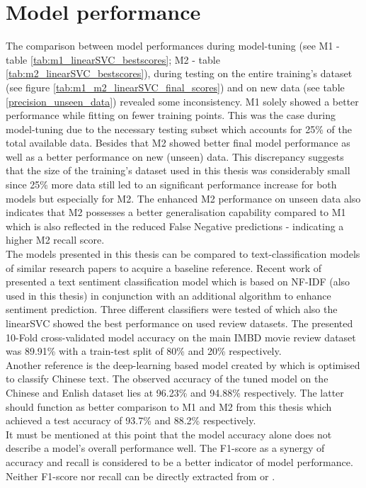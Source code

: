 \section{Model performance} \label{disussion_model_performance}
The comparison between model performances during model-tuning (see M1 - table \ref{tab:m1_linearSVC_bestscores}; M2 - table \ref{tab:m2_linearSVC_bestscores}), during testing on the entire training's dataset (see figure \ref{tab:m1_m2_linearSVC_final_scores}) and on new data (see table \ref{precision_unseen_data}) revealed some inconsistency. M1 solely showed a better performance while fitting on fewer training points. This was the case during model-tuning due to the necessary testing subset which accounts for 25\% of the total available data. Besides that M2 showed better final model performance as well as a better performance on new (unseen) data. This discrepancy suggests that the size of the training's dataset used in this thesis was considerably small since 25\% more data still led to an significant performance increase for both models but especially for M2. The enhanced M2 performance on unseen data also indicates that M2 possesses a better generalisation capability compared to M1 which is also reflected in the reduced False Negative predictions - indicating a higher M2 recall score.\\
\newline
The models presented in this thesis can be compared to text-classification models of similar research papers to acquire a baseline reference. Recent work of \parencite{Das2018} presented a text sentiment classification model which is based on NF-IDF (also used in this thesis) in conjunction with an additional algorithm to enhance sentiment prediction. Three different classifiers were tested of which also the linearSVC showed the best performance on used review datasets. The presented 10-Fold cross-validated model accuracy on the main IMBD movie review dataset was 89.91\% with a train-test split of 80\% and 20\% respectively.\\
Another reference is the deep-learning based model created by \parencite{Li2018} which is optimised to classify Chinese text. The observed accuracy of the tuned model on the Chinese and Enlish dataset lies at 96.23\% and 94.88\% respectively. The latter should function as better comparison to M1 and M2 from this thesis which achieved a test accuracy of 93.7\% and 88.2\% respectively.\\
It must be mentioned at this point that the model accuracy alone does not describe a model's overall performance well. The F1-score as a synergy of accuracy and recall is considered to be a better indicator of model performance. Neither F1-score nor recall can be directly extracted from \parencite{Das2018} or \parencite{Li2018}.\\